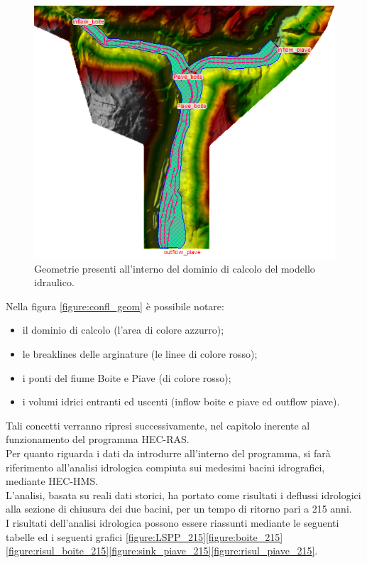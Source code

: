 \begin{figure}[htb] \centering
\includegraphics[scale=0.8]{immagini/confl_geom.PNG}
\caption{Geometrie presenti all'interno del dominio di calcolo del modello idraulico.}
\label{figure:confl_geom}    
\end{figure}
Nella figura \eqref{figure:confl_geom} è possibile notare:
\begin{itemize}
    \item il dominio di calcolo (l'area di colore azzurro);
    \item le breaklines delle arginature (le linee di colore rosso);
    \item i ponti del fiume Boite e Piave (di colore rosso);
    \item i volumi idrici entranti ed uscenti (inflow boite e piave ed outflow piave).
\end{itemize}
Tali concetti verranno ripresi successivamente, nel capitolo inerente al funzionamento del programma HEC-RAS.\\
Per quanto riguarda i dati da introdurre all'interno del programma, si farà riferimento all'analisi idrologica compiuta sui medesimi bacini idrografici, mediante HEC-HMS.\\
L'analisi, basata su reali dati storici, ha portato come risultati i deflussi idrologici alla sezione di chiusura dei due bacini, per un tempo di ritorno pari a 215 anni.\\
I risultati dell'analisi idrologica possono essere riassunti mediante le seguenti tabelle ed i seguenti grafici \eqref{figure:LSPP_215}\eqref{figure:boite_215}\eqref{figure:risul_boite_215}\eqref{figure:sink_piave_215}\eqref{figure:risul_piave_215}.


